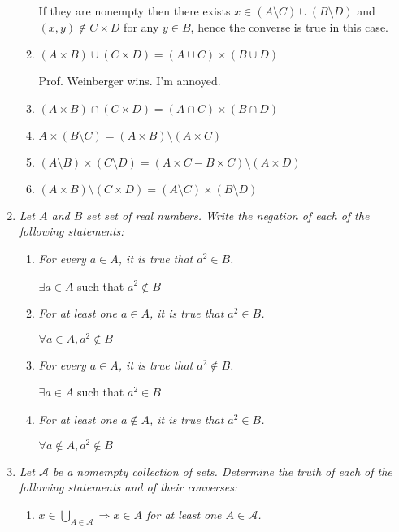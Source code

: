 \documentclass[letterpaper, 11pt]{article}
\begin{document}
\begin{enumerate}
\begin{enumerate}
If they are nonempty then there exists $x \in (A \setminus C) \cup (B \setminus D)$ and $(x,y) \notin C \times D$ for any $y \in B$, hence the converse is true in this case.

\item \emph{$(A \times B) \cup (C \times D) = (A \cup C) \times (B \cup D)$}

Prof. Weinberger wins.  I'm annoyed.

\item \emph{$(A \times B) \cap (C \times D) = (A \cap C) \times (B \cap D)$}
\item \emph{$A \times (B \setminus C) = (A \times B) \setminus (A \times C)$}
\item \emph{$(A \setminus B) \times (C \setminus D) = (A \times C - B \times C) \setminus (A \times D)$}
\item \emph{$(A \times B) \setminus (C \times D) = (A \setminus C) \times (B \setminus D)$}
\end{enumerate}

\item \emph{Let $A$ and $B$ set set of real numbers.  Write the negation of each of the following statements:}
\begin{enumerate}
\item \emph{For every $a \in A$, it is true that $a^2 \in B$.}

$\exists a \in A$ such that $a^2 \notin B$

\item \emph{For at least one $a \in A$, it is true that $a^2 \in B$.}

$\forall a \in A, a^2 \notin B$

\item \emph{For every $a \in A$, it is true that $a^2 \notin B$.}

$\exists a \in A$ such that $a^2 \in B$

\item \emph{For at least one $a \notin A$, it is true that $a^2 \in B$.}

$\forall a \notin A, a^2 \notin B$

\end{enumerate}

\item \emph{Let $\mathcal{A}$ be a nomempty collection of sets.  Determine the truth of each of the following statements and of their converses:}
\begin{enumerate}
\item \emph{$x \in \bigcup_{A \in \mathcal{A}} \Rightarrow x \in A$ for at least one $A \in \mathcal{A}$.}


\end{enumerate}
\end{enumerate}
\end{document}
